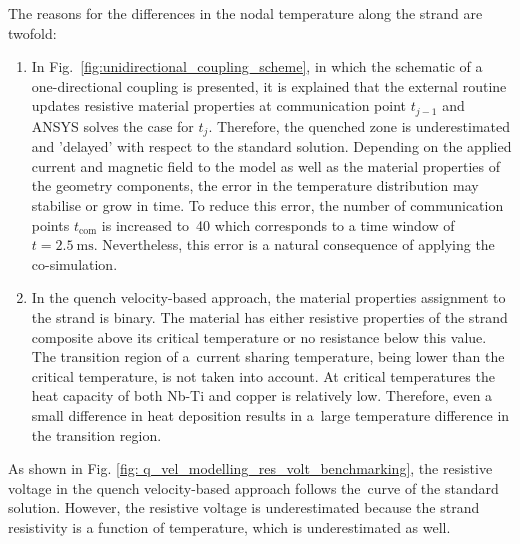 The reasons for the differences in the nodal temperature along the strand are twofold:
\begin{enumerate}
    \item In Fig.~\ref{fig:unidirectional_coupling_scheme}, in which the schematic of a one-directional coupling is presented, it is explained that the external routine updates resistive material properties at communication point $t_{j-1}$ and ANSYS solves the case for $t_{j}$. Therefore, the quenched zone is underestimated and 'delayed' with respect to the standard solution. Depending on the applied current and magnetic field to the model as well as the material properties of the geometry components, the error in the temperature distribution may stabilise or grow in time. To reduce this error, the number of communication points $t_\text{com}$ is increased to~40 which corresponds to a time window of $t=2.5~\text{ms}$. Nevertheless, this error is a natural consequence of applying the co-simulation.
    \item In the quench velocity-based approach, the material properties assignment to the strand is binary. The material has either resistive properties of the strand composite above its critical temperature or no resistance below this value. The transition region of a~current sharing temperature, being lower than the critical temperature, is not taken into account. At critical temperatures the heat capacity of both Nb-Ti and copper is relatively low. Therefore, even a small difference in heat deposition results in a~large temperature difference in the transition region. 
\end{enumerate}

As shown in Fig. \ref{fig: q_vel_modelling_res_volt_benchmarking}, the resistive voltage in the quench velocity-based approach follows the~curve of the standard solution. However, the resistive voltage is underestimated because the strand resistivity is a function of temperature, which is underestimated as well. 

